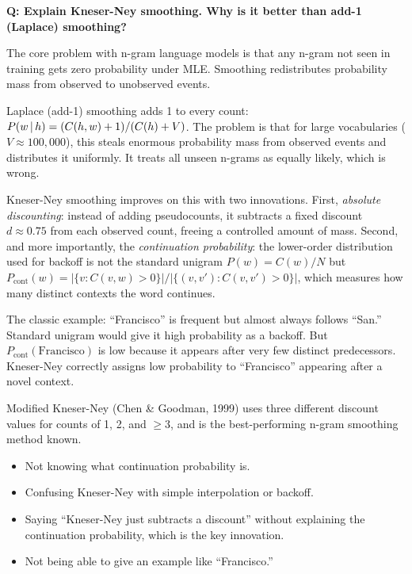 \begin{interviewq}
\textbf{Q: Explain Kneser-Ney smoothing.  Why is it better than add-1
(Laplace) smoothing?}

 \quad {} \quad \badgefreq{\freqlow}

\stronganswer
The core problem with n-gram language models is that any n-gram not seen in
training gets zero probability under MLE.  Smoothing redistributes probability
mass from observed to unobserved events.

Laplace (add-1) smoothing adds 1 to every count:
$P(w \,|\, h) = (C(h, w) + 1) / (C(h) + V)$.  The problem is that for
large vocabularies ($V \approx 100{,}000$), this steals enormous probability
mass from observed events and distributes it uniformly.  It treats all unseen
n-grams as equally likely, which is wrong.

Kneser-Ney smoothing improves on this with two innovations.  First,
\emph{absolute discounting}: instead of adding pseudocounts, it subtracts a
fixed discount $d \approx 0.75$ from each observed count, freeing a controlled
amount of mass.  Second, and more importantly, the \emph{continuation
probability}: the lower-order distribution used for backoff is not the standard
unigram $P(w) = C(w)/N$ but
$P_{\text{cont}}(w) = |\{v : C(v, w) > 0\}| / |\{(v, v') : C(v, v') > 0\}|$,
which measures how many distinct contexts the word continues.

The classic example: ``Francisco'' is frequent but almost always follows
``San.''  Standard unigram would give it high probability as a backoff.
But $P_{\text{cont}}(\text{Francisco})$ is low because it appears after very
few distinct predecessors.  Kneser-Ney correctly assigns low probability to
``Francisco'' appearing after a novel context.

Modified Kneser-Ney (Chen \& Goodman, 1999) uses three different discount
values for counts of 1, 2, and $\geq 3$, and is the best-performing n-gram
smoothing method known.

\redflags
\begin{itemize}
    \item Not knowing what continuation probability is.
    \item Confusing Kneser-Ney with simple interpolation or backoff.
    \item Saying ``Kneser-Ney just subtracts a discount'' without explaining
          the continuation probability, which is the key innovation.
    \item Not being able to give an example like ``Francisco.''
\end{itemize}


\end{interviewq}
